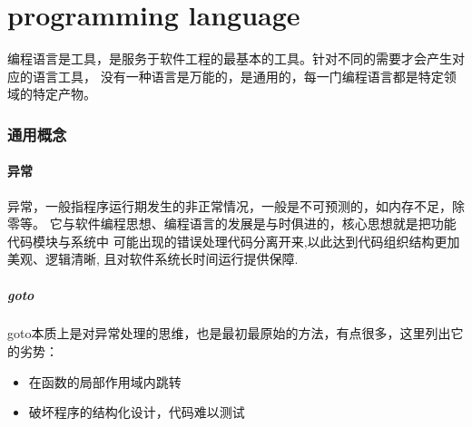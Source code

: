 \clearpage

\part{programming language}
编程语言是工具，是服务于软件工程的最基本的工具。针对不同的需要才会产生对应的语言工具，
没有一种语言是万能的，是通用的，每一门编程语言都是特定领域的特定产物。

\section{通用概念}

\subsection{异常}
异常，一般指程序运行期发生的非正常情况，一般是不可预测的，如内存不足，除零等。
它与软件编程思想、编程语言的发展是与时俱进的，核心思想就是把功能代码模块与系统中
可能出现的错误处理代码分离开来,以此达到代码组织结构更加美观、逻辑清晰,
且对软件系统长时间运行提供保障.

\subsubsection{goto}
goto本质上是对异常处理的思维，也是最初最原始的方法，有点很多，这里列出它的劣势：
\begin{itemize}
    \item {在函数的局部作用域内跳转}
    \item {破坏程序的结构化设计，代码难以测试}
\end{itemize}

